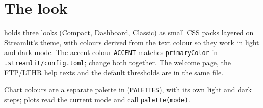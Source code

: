 \section{The look}\label{sec:theme}

 holds three looks (Compact, Dashboard, Classic) as small CSS packs layered on Streamlit's theme, with
colours derived from the text colour so they work in light and dark mode. The accent colour \texttt{ACCENT} matches
\texttt{primaryColor} in \texttt{.streamlit/config.toml}; change both together. The welcome page, the FTP/LTHR help
texts and the default thresholds are in the same file.

Chart colours are a separate palette in  (\texttt{PALETTES}), with its own light and dark
steps; plots read the current mode and call \texttt{palette(mode)}.
